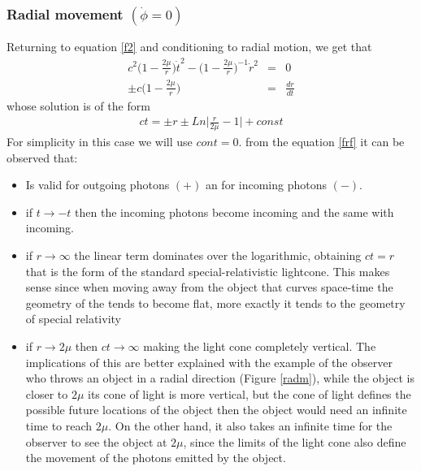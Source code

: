 \documentclass[letterpaper,11pt,onecolumn]{article}
\begin{document}
\subsubsection{Radial movement $(\dot{\phi}=0)$}
Returning to equation \ref{f2} and conditioning to radial motion, we get that
 \begin{eqnarray*}
       c^{2}\Big( 1- \frac{2\mu}{r}\Big) \dot{t}^{2}-\Big( 1-\frac{2\mu}{r}\Big)^{-1} \dot{r}^{2}&=&0\\
       \pm  c\Big( 1- \frac{2\mu}{r}\Big)&=&\frac{dr}{dt}
\end{eqnarray*}
whose solution is of the form
  \begin{eqnarray}
       ct=\pm r\pm Ln\Big| \frac{r}{2\mu}-1 \Big|+const\label{frf}
 \end{eqnarray}
 For simplicity in this case we will use $cont=0$. from the equation \ref{frf} it can be observed that:
\begin{itemize}
    \item Is valid for outgoing photons $(+)$ an for incoming photons $(-)$.
    \item if $t\rightarrow -t$ then the incoming photons become incoming and the same with incoming.
    \item if $r \rightarrow \infty$ the linear term dominates over the logarithmic, obtaining $ct=r$ that is the form of the standard special-relativistic lightcone. This makes sense since when moving away from the object that curves space-time the geometry of the tends to become flat, more exactly it tends to the geometry of special relativity
    \item if $r \rightarrow 2\mu$ then $ct\rightarrow \infty$ making the light cone completely vertical. The implications of this are better explained with the example of the observer who throws an object in a radial direction (Figure \ref{radm}), while the object is closer to $2\mu$ its cone of light is more vertical, but the cone of light defines the possible future locations of the object then the object would need an infinite time to reach $2\mu$. On the other hand, it also takes an infinite time for the observer to see the object at $2\mu$, since the limits of the light cone also define the movement of the photons emitted by the object.
\end{itemize}
\end{document}
